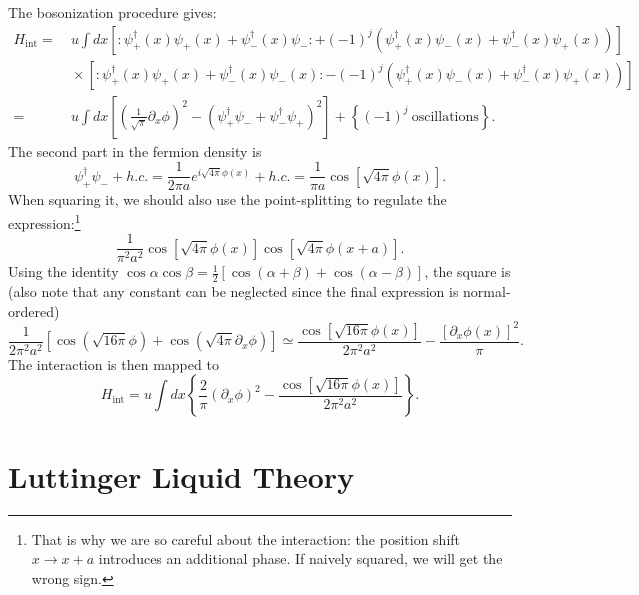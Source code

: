 \documentclass[aps,prb,superscriptaddress,nofootinbib]{revtex4}
\begin{document}
The bosonization procedure gives:
\begin{equation*}
\begin{aligned}
	H_\text{int} =& \ u \int dx \left[: \psi_+^{\dagger}(x) \psi_+(x)+\psi_-^{\dagger}(x) \psi_-:+(-1)^{j}\left(\psi_+^{\dagger}(x) \psi_-(x)+\psi_-^{\dagger}(x) \psi_+(x)\right)\right] \\
	&\ \times\left[: \psi_+^{\dagger}(x) \psi_+(x)+\psi_-^{\dagger}(x) \psi_-(x):-(-1)^{j}\left(\psi_+^{\dagger}(x) \psi_-(x)+\psi_-^{\dagger}(x) \psi_+(x)\right)\right] \\
	=&\ u\int dx \left[\left(\frac{1}{\sqrt{\pi}} \partial_{x} \phi\right)^{2}-\left(\psi_+^{\dagger} \psi_- + \psi_-^{\dagger} \psi_+\right)^{2} \right] 
		+\left\{(-1)^j\ \text{oscillations} \right\}.
\end{aligned}
\end{equation*}
The second part in the fermion density is
\begin{equation*}
	\psi_+^\dagger \psi_- + h.c.
	= \frac{1}{2\pi a} e^{i\sqrt{4\pi}\phi(x)} + h.c. 
	= \frac{1}{\pi a}\cos\left[\sqrt{4\pi}\phi(x)\right].
\end{equation*}
When squaring it, we should also use the point-splitting to regulate the expression:\footnote{That is why we are so careful about the interaction: the position shift $x\rightarrow x+a$ introduces an additional phase. If naively squared, we will get the wrong sign.}
\begin{equation*}
	\frac{1}{\pi^2 a^2} \cos\left[\sqrt{4\pi}\phi(x)\right]\cos\left[\sqrt{4\pi}\phi(x+a)\right].
\end{equation*}
Using the identity $\cos\alpha \cos\beta = \frac{1}{2}[\cos(\alpha+\beta)+\cos(\alpha-\beta)]$, the square is (also note that any constant can be neglected since the final expression is normal-ordered)
\begin{equation*}
	\frac{1}{2\pi^2 a^2}\left[\cos\left(\sqrt{16\pi}\phi\right)+\cos\left(\sqrt{4\pi}\partial_x\phi \right)\right]
	\simeq \frac{\cos\left[\sqrt{16\pi}\phi(x)\right]}{2\pi^2 a^2} - \frac{[\partial_x\phi(x)]^2}{\pi}.
\end{equation*}
The interaction is then mapped to
\begin{equation}
	H_\text{int} = u\int dx \left\{\frac{2}{\pi}(\partial_x\phi)^2 - \frac{\cos\left[\sqrt{16\pi}\phi(x)\right]}{2\pi^2 a^2}\right\}.
\end{equation}



\section{Luttinger Liquid Theory}
\end{document}

